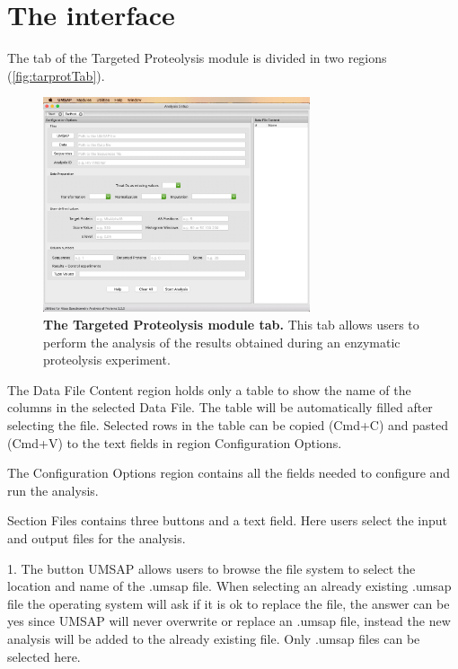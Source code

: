 \section{The interface}

The tab of the Targeted Proteolysis module is divided in two regions (\autoref{fig:tarprotTab}).

\begin{figure}[h]
    \centering
    \includegraphics[width=0.7\textwidth]{./IMAGES/MOD-TARPROT/tarprot-mod.jpg}
    \caption[The Targeted Proteolysis module tab]{\textbf{The Targeted Proteolysis
    module tab.} This tab allows users to perform the analysis of the results obtained
    during an enzymatic proteolysis experiment.}
    \label{fig:tarprotTab}
    \vspace{-5pt}
\end{figure} 

The Data File Content region holds only a table to show the name of the columns in
the selected Data File. The table will be automatically filled after selecting the
file. Selected rows in the table can be copied (Cmd+C) and pasted (Cmd+V) to the
text fields in region Configuration Options.

The Configuration Options region contains all the fields needed to configure and
run the analysis.

Section Files contains three buttons and a text field. Here users select the input
and output files for the analysis.

\num{1}. The button UMSAP allows users to browse the file system to select the location
and name of the .umsap file. When selecting an already existing .umsap file the operating
system will ask if it is ok to replace the file, the answer can be yes since UMSAP
will never overwrite or replace an .umsap file, instead the new analysis will be
added to the already existing file. Only .umsap files can be selected here.

